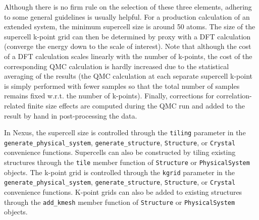 \documentclass[oneside,11pt]{memoir}
\numberwithin{equation}{section}
\begin{document}
Although there is no firm rule on the selection of these three elements, 
adhering to some general guidelines is usually helpful.  For a production 
calculation of an extended system, the minimum supercell size is around 50 
atoms.  The size of the supercell k-point grid can then be determined by 
proxy with a DFT calculation (converge the energy down to the scale of 
interest).  Note that although the cost of a DFT calculation scales linearly 
with the number of k-points, the cost of the corresponding QMC calculation 
is hardly increased due to the statistical averaging of the results 
(the QMC calculation at each separate supercell k-point is simply performed 
with fewer samples so that the total number of samples remains fixed w.r.t. 
the number of k-points).  Finally, corrections for correlation-related 
finite size effects are computed during the QMC run and added to the result 
by hand in post-processing the data.

In Nexus, the supercell size is controlled through the 
\texttt{tiling} parameter in the \texttt{generate\_physical\_system}, 
\texttt{generate\_structure}, \texttt{Structure}, or \texttt{Crystal} 
convenience functions.  Supercells can also be constructed by tiling existing 
structures through the \texttt{tile} member function of \texttt{Structure} or 
\texttt{PhysicalSystem} objects.  The k-point grid is controlled through the 
\texttt{kgrid} parameter in the 
\texttt{generate\_physical\_system}, 
\texttt{generate\_structure}, \texttt{Structure}, or \texttt{Crystal} 
convenience functions.  K-point grids can also be added to existing structures 
through the \texttt{add\_kmesh} member function of \texttt{Structure} or 
\texttt{PhysicalSystem} objects.
\end{document}
